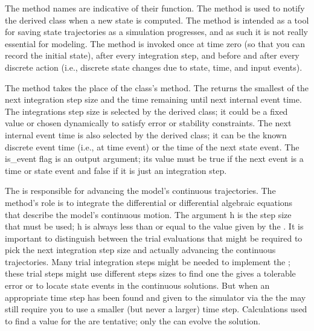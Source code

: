 The method names are indicative of their function. The  method is used to notify the derived class when a new state is computed. The method is intended as a tool for saving state trajectories as a simulation progresses, and as such it is not really essential for modeling. The  method is invoked once at time zero (so that you can record the initial state), after every integration step, and before and after every discrete action (i.e., discrete state changes due to state, time, and input events).

The  method takes the place of the  class's  method. The  returns the smallest of the next integration step size and the time remaining until next internal event time. The integrations step size is selected by the derived class; it could be a fixed value or chosen dynamically to satisfy error or stability constraints. The next internal event time is also selected by the derived class; it can be the known discrete event time (i.e., at time event) or the time of the next state event. The is\_event flag is an output argument; its value must be true if the next event is a time or state event and false if it is just an integration step. 

The  is responsible for advancing the model's continuous trajectories. The method's role is to integrate the differential or differential algebraic equations that describe the model's continuous motion. The argument h is the step size that must be used; h is always less than or equal to the value given by the . It is important to distinguish between the trial evaluations that might be required to pick the next integration step size and actually advancing the continuous trajectories. Many trial integration steps might be needed to implement the ; these trial steps might use different steps sizes to find one the gives a tolerable error or to locate state events in the continuous solutions. But when an appropriate time step has been found and given to the simulator via the  the  may still require you to use a smaller (but never a larger) time step. Calculations used to find a value for the  are tentative; only the  can evolve the solution.

